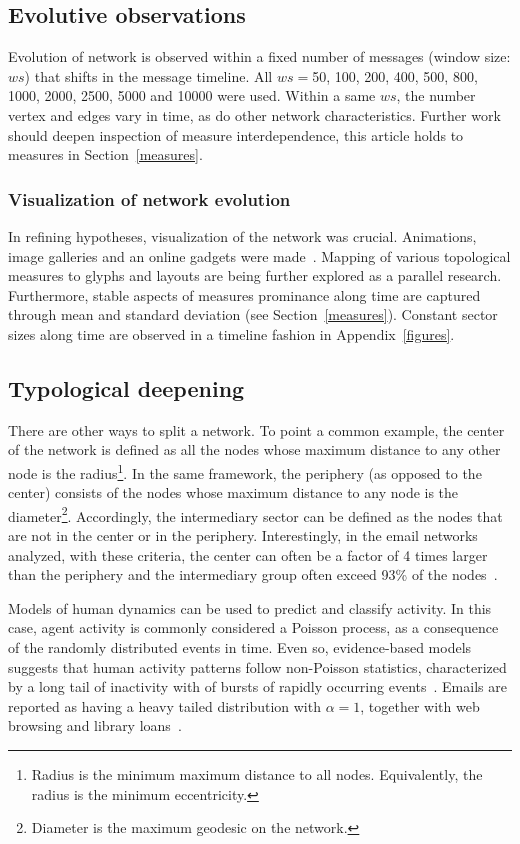 \documentclass[%
 aip,
 jmp,%
 amsmath,amssymb,
 reprint,%
]{revtex4-1}
\begin{document}
   \subsection{Evolutive observations}
Evolution of network is observed within a fixed number of messages (window size: $ws$) that shifts in the message timeline.
 All $ws=$50, 100, 200, 400, 500, 800, 1000, 2000, 2500, 5000 and 10000 were used. Within a same $ws$, the number vertex and edges vary in time, as do other network characteristics. Further work should deepen inspection of measure interdependence, this article holds to measures in Section~\ref{measures}.

        \subsubsection*{Visualization of network evolution}
In refining hypotheses, visualization of the network was crucial. Animations, image galleries and an online gadgets were made~\cite{animacoes,galGMANE,appGMANE}. Mapping of various topological measures to glyphs and layouts are being further explored as a parallel research. Furthermore, stable aspects of measures prominance along time are captured through mean and standard deviation (see Section~\ref{measures}). Constant sector sizes along time are observed in a timeline fashion in Appendix~\ref{figures}.


    \subsection{Typological deepening}
There are other ways to split a network. To point a common example, the center of the network is defined as all the nodes whose maximum distance to any other node is the radius\footnote{Radius is the minimum maximum distance to all nodes. Equivalently, the radius is the minimum eccentricity.}. 
In the same framework, the periphery (as opposed to the center) consists of the nodes whose maximum distance to any node is the diameter\footnote{Diameter is the maximum geodesic on the network.}. Accordingly, the intermediary sector can be defined as the nodes that are not in the center or in the periphery. Interestingly, in the email networks analyzed, with these criteria, the center can often be a factor of 4 times larger than the periphery and the intermediary group often exceed 93\% of the nodes~\cite{networkx}.

Models of human dynamics can be used to predict and classify activity. In this case, agent activity is commonly considered a Poisson process, as a consequence of the randomly distributed events in time. Even so, evidence-based models suggests that human activity patterns follow non-Poisson statistics, characterized by a long tail of inactivity with of bursts of rapidly occurring events~\cite{barabasiHumanDyn,barabasiPhone}. Emails are reported as having a heavy tailed distribution with $\alpha=1$, together with web browsing and library loans~\cite{barabasiHumanDyn}.
\end{document}
